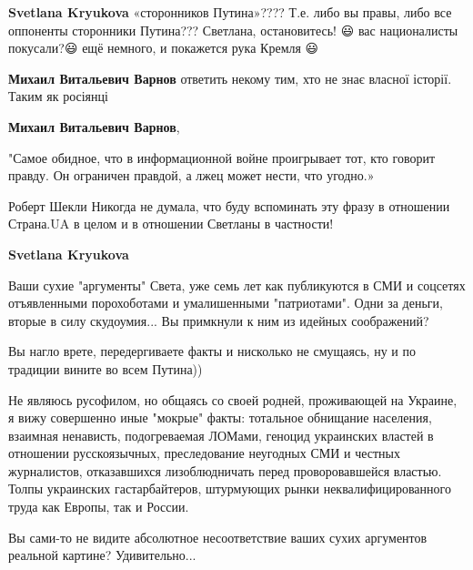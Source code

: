 \begin{itemize}
\begin{itemize}
\textbf{Svetlana Kryukova} «сторонников Путина»???? Т.е. либо вы правы, либо все оппоненты сторонники Путина??? Светлана, остановитесь! 😃 вас националисты покусали?😃 ещё немного, и покажется рука Кремля 😃

 
\textbf{Михаил Витальевич Варнов} ответить некому тим, хто не знає власної історії. Таким як росіянці

 
\textbf{Михаил Витальевич Варнов}, 

"Самое обидное, что в информационной войне проигрывает тот, кто говорит правду.
Он ограничен правдой, а лжец может нести, что угодно.»

Роберт Шекли Никогда не думала, что буду вспоминать эту фразу в отношении
Страна.UA в целом и в отношении Светланы в частности!

 
\textbf{Svetlana Kryukova} 

Ваши сухие "аргументы" Света, уже семь лет как публикуются в СМИ и соцсетях
отъявленными порохоботами и умалишенными "патриотами". Одни за деньги, вторые в
силу скудоумия... Вы примкнули к ним из идейных соображений?

Вы нагло врете, передергиваете факты и нисколько не смущаясь, ну и по традиции
вините во всем Путина))

Не являюсь русофилом, но общаясь со своей родней, проживающей на Украине, я
вижу совершенно иные "мокрые" факты: тотальное обнищание населения, взаимная
ненависть, подогреваемая ЛОМами, геноцид украинских властей в отношении
русскоязычных, преследование неугодных СМИ и честных журналистов, отказавшихся
лизоблюдничать перед проворовавшейся властью. Толпы украинских гастарбайтеров,
штурмующих рынки неквалифицированного труда как Европы, так и России.

Вы сами-то не видите абсолютное несоответствие ваших сухих аргументов реальной
картине? Удивительно...



\end{itemize}
\end{itemize}
